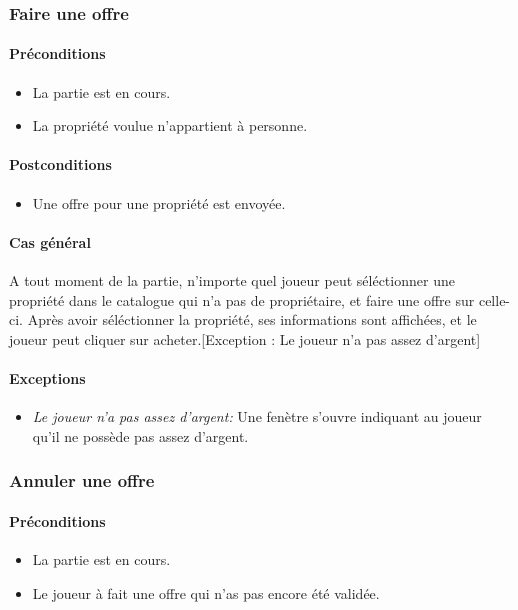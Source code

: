 \documentclass[a4paper,11pt]{report}
\begin{document}
\subsubsection{Faire une offre}
\paragraph{Préconditions}
\begin{itemize}
 \item La partie est en cours.
 \item La propriété voulue n'appartient à personne.
\end{itemize}
\paragraph{Postconditions}
\begin{itemize}
 \item Une offre pour une propriété est envoyée.
\end{itemize}
\paragraph{Cas général}
A tout moment de la partie, n'importe quel joueur peut séléctionner une propriété dans le catalogue qui n'a pas de propriétaire, et faire une offre sur celle-ci. Après avoir séléctionner la propriété, ses informations sont affichées, et le joueur peut cliquer sur acheter.[Exception : Le joueur n'a pas assez d'argent]
\paragraph{Exceptions}
\begin{itemize}
 \item \textit{Le joueur n'a pas assez d'argent:} Une fenètre s'ouvre indiquant au joueur qu'il ne possède pas assez d'argent.
\end{itemize}

\subsubsection{Annuler une offre}
\paragraph{Préconditions}
\begin{itemize}
 \item La partie est en cours.
 \item Le joueur à fait une offre qui n'as pas encore été validée.
\end{itemize}
\end{document}
